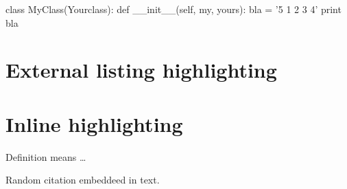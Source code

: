 \begin{python}
class MyClass(Yourclass):
  def __init__(self, my, yours):
      bla = '5 1 2 3 4'
      print bla
\end{python}

\section{External listing highlighting}


\section{Inline highlighting}

Definition  means \dots





Random citation \cite{the_lexer_hack} embeddeed in text.

\newpage



